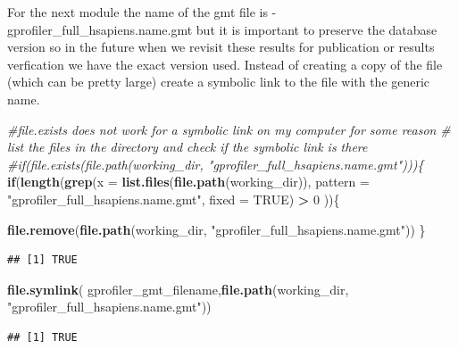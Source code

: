 \documentclass[
]{book}
\newenvironment{Shaded}{\begin{snugshade}}{\end{snugshade}}
\newcommand{\AttributeTok}[1]{\textcolor[rgb]{0.13,0.29,0.53}{#1}}
\newcommand{\CommentTok}[1]{\textcolor[rgb]{0.56,0.35,0.01}{\textit{#1}}}
\newcommand{\ConstantTok}[1]{\textcolor[rgb]{0.56,0.35,0.01}{#1}}
\newcommand{\ControlFlowTok}[1]{\textcolor[rgb]{0.13,0.29,0.53}{\textbf{#1}}}
\newcommand{\DecValTok}[1]{\textcolor[rgb]{0.00,0.00,0.81}{#1}}
\newcommand{\FunctionTok}[1]{\textcolor[rgb]{0.13,0.29,0.53}{\textbf{#1}}}
\newcommand{\NormalTok}[1]{#1}
\newcommand{\SpecialCharTok}[1]{\textcolor[rgb]{0.81,0.36,0.00}{\textbf{#1}}}
\newcommand{\StringTok}[1]{\textcolor[rgb]{0.31,0.60,0.02}{#1}}
\begin{document}
For the next module the name of the gmt file is - gprofiler\_full\_hsapiens.name.gmt but it is important to preserve the database version so in the future when we revisit these results for publication or results verfication we have the exact version used. Instead of creating a copy of the file (which can be pretty large) create a symbolic link to the file with the generic name.

\begin{Shaded}
\begin{Highlighting}[]
\CommentTok{\#file.exists does not work for a symbolic link on my computer for some reason}
\CommentTok{\# list the files in the directory and check if the symbolic link is there}
\CommentTok{\#if(file.exists(file.path(working\_dir, "gprofiler\_full\_hsapiens.name.gmt")))\{}
\ControlFlowTok{if}\NormalTok{(}\FunctionTok{length}\NormalTok{(}\FunctionTok{grep}\NormalTok{(}\AttributeTok{x =} \FunctionTok{list.files}\NormalTok{(}\FunctionTok{file.path}\NormalTok{(working\_dir)), }
              \AttributeTok{pattern =} \StringTok{"gprofiler\_full\_hsapiens.name.gmt"}\NormalTok{,}
              \AttributeTok{fixed =} \ConstantTok{TRUE}\NormalTok{) }\SpecialCharTok{\textgreater{}} \DecValTok{0}\NormalTok{ ))\{}

  \FunctionTok{file.remove}\NormalTok{(}\FunctionTok{file.path}\NormalTok{(working\_dir, }\StringTok{"gprofiler\_full\_hsapiens.name.gmt"}\NormalTok{))}
\NormalTok{\}}
\end{Highlighting}
\end{Shaded}

\begin{verbatim}
## [1] TRUE
\end{verbatim}

\begin{Shaded}
\begin{Highlighting}[]
\FunctionTok{file.symlink}\NormalTok{( gprofiler\_gmt\_filename,}\FunctionTok{file.path}\NormalTok{(working\_dir, }
                                   \StringTok{"gprofiler\_full\_hsapiens.name.gmt"}\NormalTok{))}
\end{Highlighting}
\end{Shaded}

\begin{verbatim}
## [1] TRUE
\end{verbatim}
\end{document}
